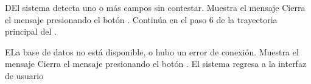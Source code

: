 \begin{UCtrayectoriaA}{D}{El sistema detecta uno o más campos sin contestar.}
	\UCpaso Muestra el mensaje 
	\UCpaso[\UCactor] Cierra el mensaje presionando el botón .
    \UCpaso Continúa en el paso 6 de la trayectoria principal del .
\end{UCtrayectoriaA}

\begin{UCtrayectoriaA}{E}{La base de datos no está disponible, o hubo un error de conexión.}
	\UCpaso Muestra el mensaje 
	\UCpaso[\UCactor] Cierra el mensaje presionando el botón .
	\UCpaso El sistema regresa a la interfaz de usuario
\end{UCtrayectoriaA}